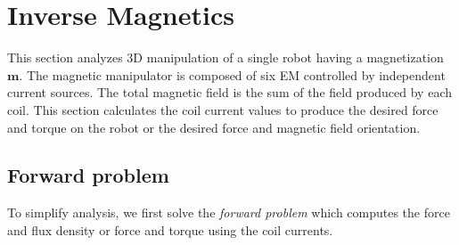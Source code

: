 \section{Inverse Magnetics}\label{sec:invMagnetics}
This section analyzes 3D manipulation of a single robot having a magnetization $\mathbf{m}$. The magnetic manipulator is composed of six EM controlled by independent current sources. The total magnetic field is the sum of the field produced by each coil.
 This section calculates the coil current values to produce the desired force and torque on the robot or the desired force and magnetic field orientation.

\subsection{Forward problem} \label{Forward}
To simplify analysis, we first solve the \emph{forward problem} which computes the force and flux density or force and torque using the coil currents. 

